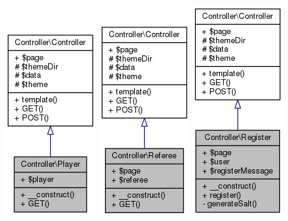 \documentclass[11pt]{article}
\begin{document}
\includegraphics[scale=0.4]{UML_Controller_1_1Player.png}
\includegraphics[scale=0.4]{UML_Controller_1_1Referee.png}
\includegraphics[scale=0.4]{UML_Controller_1_1Register.png}
\end{document}
